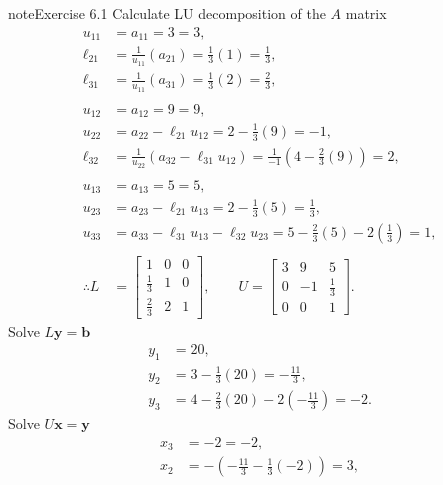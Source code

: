\documentclass[letterpaper,10pt,english]{jupyterBook}
\begin{document}
\begin{sphinxadmonition}{note}{Exercise 6.1}
\sphinxAtStartPar
Calculate LU decomposition of the \(A\) matrix
\begin{align*}
    u_{11} &= a_{11} = 3 = 3, \\
    \ell_{21} &= \frac{1}{u_{11}}\left(a_{21}\right) = \frac{1}{3}\left(1\right) = \frac{1}{3}, \\
    \ell_{31} &= \frac{1}{u_{11}}\left(a_{31}\right) = \frac{1}{3}\left(2\right) = \frac{2}{3}, \\
    \\
    u_{12} &= a_{12} = 9 = 9, \\
    u_{22} &= a_{22} - \ell_{21} u_{12} = 2 - \frac{1}{3}\left(9\right) = -1, \\
    \ell_{32} &= \frac{1}{u_{22}}\left(a_{32} - \ell_{31} u_{12}\right) = \frac{1}{-1}\left(4 - \frac{2}{3}\left(9\right)\right) = 2, \\
    \\
    u_{13} &= a_{13} = 5 = 5, \\
    u_{23} &= a_{23} - \ell_{21} u_{13} = 2 - \frac{1}{3}\left(5\right) = \frac{1}{3}, \\
    u_{33} &= a_{33} - \ell_{31} u_{13} - \ell_{32} u_{23} = 5 - \frac{2}{3}\left(5\right) - 2\left(\frac{1}{3}\right) = 1, \\
    \\
    \therefore L &= \left[\begin{matrix}1 & 0 & 0\\\frac{1}{3} & 1 & 0\\\frac{2}{3} & 2 & 1\end{matrix}\right], \qquad
    U = \left[\begin{matrix}3 & 9 & 5\\0 & -1 & \frac{1}{3}\\0 & 0 & 1\end{matrix}\right].
\end{align*}
\sphinxAtStartPar
Solve \(L \mathbf{{y}} = \mathbf{{b}}\)
\begin{align*}
    y_{1} &= 20, \\
    y_{2} &= 3 - \frac{1}{3}\left(20\right) = - \frac{11}{3}, \\
    y_{3} &= 4 - \frac{2}{3}\left(20\right) - 2\left(- \frac{11}{3}\right) = -2.
\end{align*}
\sphinxAtStartPar
Solve \(U \mathbf{{x}} = \mathbf{{y}}\)
\begin{align*}
    x_{3} &= -2 = -2, \\
    x_{2} &= -\left(- \frac{11}{3} - \frac{1}{3}\left(-2\right)\right) = 3, \\

\end{align*}
\end{sphinxadmonition}
\end{document}
